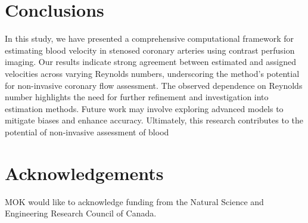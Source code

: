 \documentclass[times,twocolumn,final]{elsarticle}
\begin{document}
\section{Conclusions}
In this study, we have presented a comprehensive computational framework for estimating blood velocity in stenosed coronary arteries using contrast perfusion imaging. Our results indicate strong agreement between estimated and assigned velocities across varying Reynolds numbers, underscoring the method's potential for non-invasive coronary flow assessment. The observed dependence on Reynolds number highlights the need for further refinement and investigation into estimation methods. Future work may involve exploring advanced models to mitigate biases and enhance accuracy. Ultimately, this research contributes to the potential of non-invasive assessment of blood


\section*{Acknowledgements}
MOK would like to acknowledge funding from the Natural Science and Engineering Research Council of Canada. 



\end{document}
